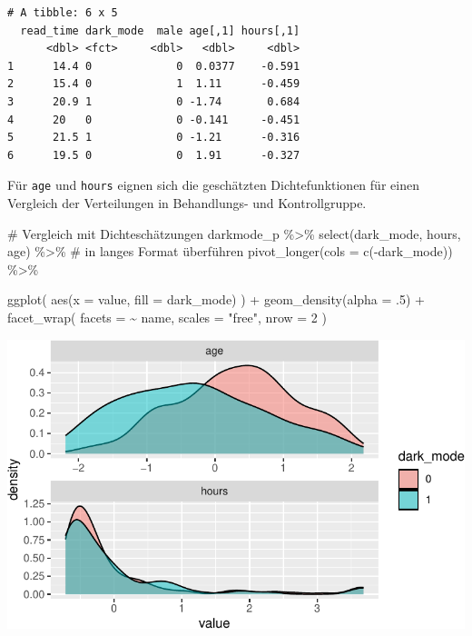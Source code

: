 \documentclass[
  a4paper,
  DIV=11,
  oneside]{scrreprt}
\newenvironment{Shaded}{\begin{snugshade}}{\end{snugshade}}
\newcommand{\AttributeTok}[1]{\textcolor[rgb]{0.40,0.45,0.13}{#1}}
\newcommand{\CommentTok}[1]{\textcolor[rgb]{0.37,0.37,0.37}{#1}}
\newcommand{\DecValTok}[1]{\textcolor[rgb]{0.68,0.00,0.00}{#1}}
\newcommand{\FunctionTok}[1]{\textcolor[rgb]{0.28,0.35,0.67}{#1}}
\newcommand{\NormalTok}[1]{\textcolor[rgb]{0.00,0.23,0.31}{#1}}
\newcommand{\SpecialCharTok}[1]{\textcolor[rgb]{0.37,0.37,0.37}{#1}}
\newcommand{\StringTok}[1]{\textcolor[rgb]{0.13,0.47,0.30}{#1}}
\begin{document}
\begin{verbatim}
# A tibble: 6 x 5
  read_time dark_mode  male age[,1] hours[,1]
      <dbl> <fct>     <dbl>   <dbl>     <dbl>
1      14.4 0             0  0.0377    -0.591
2      15.4 0             1  1.11      -0.459
3      20.9 1             0 -1.74       0.684
4      20   0             0 -0.141     -0.451
5      21.5 1             0 -1.21      -0.316
6      19.5 0             0  1.91      -0.327
\end{verbatim}

Für \texttt{age} und \texttt{hours} eignen sich die geschätzten
Dichtefunktionen für einen Vergleich der Verteilungen in Behandlungs-
und Kontrollgruppe.

\begin{Shaded}
\begin{Highlighting}[]
\CommentTok{\# Vergleich mit Dichteschätzungen}
\NormalTok{darkmode\_p }\SpecialCharTok{\%\textgreater{}\%}
  \FunctionTok{select}\NormalTok{(dark\_mode, hours, age) }\SpecialCharTok{\%\textgreater{}\%}
  \CommentTok{\# in langes Format überführen}
  \FunctionTok{pivot\_longer}\NormalTok{(}\AttributeTok{cols =} \FunctionTok{c}\NormalTok{(}\SpecialCharTok{{-}}\NormalTok{dark\_mode)) }\SpecialCharTok{\%\textgreater{}\%}
  
  \FunctionTok{ggplot}\NormalTok{(}
    \FunctionTok{aes}\NormalTok{(}\AttributeTok{x =}\NormalTok{ value, }\AttributeTok{fill =}\NormalTok{ dark\_mode)}
\NormalTok{    ) }\SpecialCharTok{+}
  \FunctionTok{geom\_density}\NormalTok{(}\AttributeTok{alpha =}\NormalTok{ .}\DecValTok{5}\NormalTok{) }\SpecialCharTok{+} 
  \FunctionTok{facet\_wrap}\NormalTok{(}
    \AttributeTok{facets =} \SpecialCharTok{\textasciitilde{}}\NormalTok{ name, }
    \AttributeTok{scales =} \StringTok{"free"}\NormalTok{, }
    \AttributeTok{nrow =} \DecValTok{2}
\NormalTok{    )}
\end{Highlighting}
\end{Shaded}

\includegraphics{Matching_files/figure-pdf/unnamed-chunk-14-1.pdf}
\end{document}
